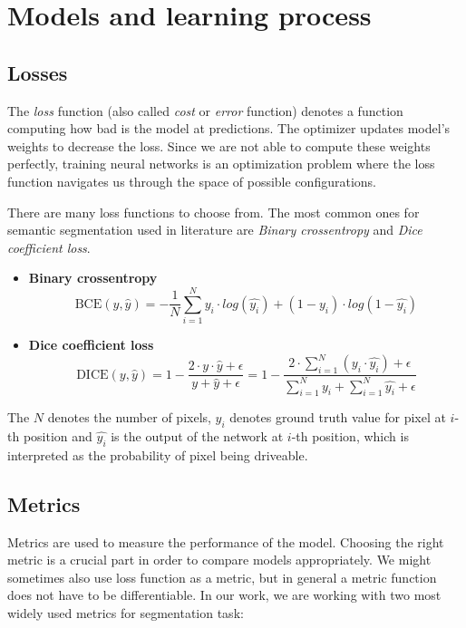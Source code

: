 \section{Models and learning process}
\label{sec:learning}

\subsection{Losses}
\label{sec:learning:losses}

The \textit{loss} function (also called \textit{cost} or \textit{error} function) denotes
a function computing how bad is the model at predictions. The optimizer
updates model's weights to decrease the loss. Since we are not able to compute these
weights perfectly, training neural networks is an optimization problem where the loss 
function navigates us through the space of possible configurations.

There are many loss functions to choose from. The most common ones for semantic segmentation
used in literature are \textit{Binary crossentropy} and \textit{Dice coefficient loss}. 

\begin{itemize}
    \item \textbf{Binary crossentropy}
        $$\textrm{BCE}(y, \hat{y}) = -\frac{1}{N}\sum\limits_{i=1}^N y_i\cdot log(\hat{y_i}) + (1-y_i)\cdot log(1-\hat{y_i})$$
    \item \textbf{Dice coefficient loss}
        $$\textrm{DICE}(y, \hat{y}) = 1 - \frac{2\cdot y\cdot \hat{y} + \epsilon}{y + \hat{y} +
        \epsilon} =
        1 - \frac{2\cdot \sum\limits_{i=1}^N (y_i \cdot \hat{y_i}) +
        \epsilon}{\sum\limits_{i=1}^N y_i + \sum\limits_{i=1}^N \hat{y_i} + \epsilon}$$
\end{itemize}

The $N$ denotes the number of pixels,
$y_i$ denotes ground truth value for pixel at $i$-th position and $\hat{y_i}$ is the
output of the network at $i$-th position, which is interpreted as the probability of pixel
being driveable.

\subsection{Metrics}
\label{sec:learning:metrics}

Metrics are used to measure the performance of the model. Choosing the right metric
is a crucial part in order to compare models appropriately. We might sometimes also use loss
function as a metric, but in general a metric function does not have to be differentiable.
In our work, we are working with two most widely used metrics for segmentation task:

